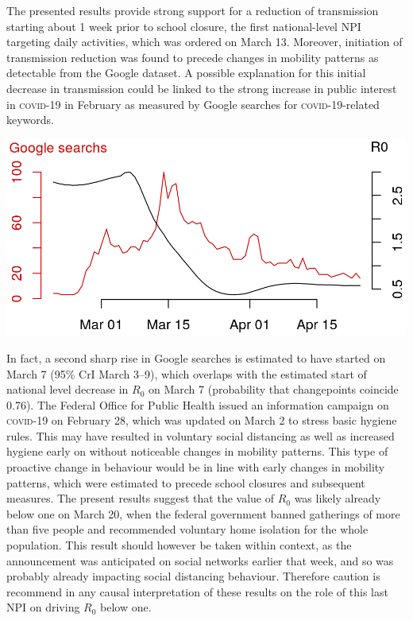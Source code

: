 The presented results provide strong support for a reduction of transmission starting about 1 week prior to school closure, the first national-level NPI targeting daily activities, which was ordered on March 13. Moreover, initiation of transmission reduction was found to precede changes in mobility patterns as detectable from the Google dataset. A possible explanation for this initial decrease in transmission could be linked to the strong increase in public interest in \textsc{covid}-19 in February as measured by Google searches for \textsc{covid}-19-related keywords.
\begin{marginfigure}[1\baselineskip]
\includegraphics{fig_covid-switzerland-npi/fig_supp/google_trends.png}
\end{marginfigure}
 In fact, a second sharp rise in Google searches is estimated to have started on March 7 (95\% CrI March 3–9), which overlaps with the estimated start of national level decrease in $R_0$ on March 7 (probability that changepoints coincide 0.76). The Federal Office for Public Health issued an information campaign on \textsc{covid}-19 on February 28, which was updated on March 2 to stress basic hygiene rules\cite{OFSP:NouvellesReglesHygiene:2020}. This may have resulted in voluntary social distancing as well as increased hygiene early on without noticeable changes in mobility patterns. This type of proactive change in behaviour would be in line with early changes in mobility patterns, which were estimated to precede school closures and subsequent measures. The present results suggest that the value of $R_0$ was likely already below one on March 20, when the federal government banned gatherings of more than five people and recommended voluntary home isolation for the whole population. This result should however be taken within context, as the announcement was anticipated on social networks earlier that week, and so was probably already impacting social distancing behaviour. 
Therefore caution is recommend in any causal interpretation of these results on the role of this last NPI on driving $R_0$ below one.


